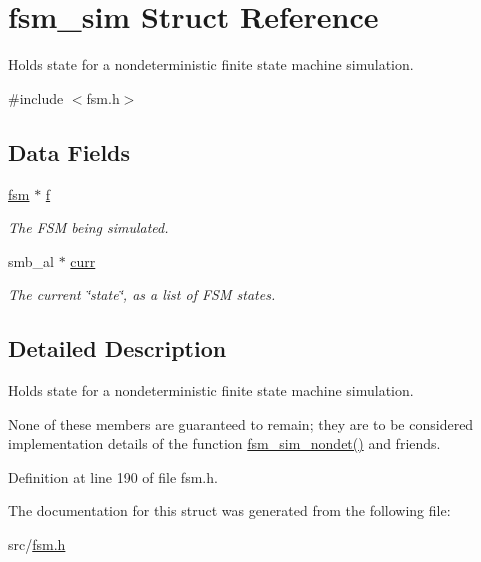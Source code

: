 \hypertarget{structfsm__sim}{\section{fsm\-\_\-sim \-Struct \-Reference}
\label{structfsm__sim}
}


\-Holds state for a nondeterministic finite state machine simulation.  




{\ttfamily \#include $<$fsm.\-h$>$}

\subsection*{\-Data \-Fields}
\begin{DoxyCompactItemize}
\item 
\hypertarget{structfsm__sim_adb419c73376b8d2d2393ffb15910f71b}{\hyperlink{structfsm}{fsm} $\ast$ \hyperlink{structfsm__sim_adb419c73376b8d2d2393ffb15910f71b}{f}}\label{structfsm__sim_adb419c73376b8d2d2393ffb15910f71b}

\begin{DoxyCompactList}\small\item\em \-The \-F\-S\-M being simulated. \end{DoxyCompactList}\item 
\hypertarget{structfsm__sim_a2a263ebdc022dbb02c7d4bb15c344f7c}{smb\-\_\-al $\ast$ \hyperlink{structfsm__sim_a2a263ebdc022dbb02c7d4bb15c344f7c}{curr}}\label{structfsm__sim_a2a263ebdc022dbb02c7d4bb15c344f7c}

\begin{DoxyCompactList}\small\item\em \-The current \char`\"{}state\char`\"{}, as a list of \-F\-S\-M states. \end{DoxyCompactList}\end{DoxyCompactItemize}


\subsection{\-Detailed \-Description}
\-Holds state for a nondeterministic finite state machine simulation. 

\-None of these members are guaranteed to remain; they are to be considered implementation details of the function \hyperlink{simulation_8c_ab39350b6a48388414f90cb3d248be612}{fsm\-\_\-sim\-\_\-nondet()} and friends. 

\-Definition at line 190 of file fsm.\-h.



\-The documentation for this struct was generated from the following file\-:\begin{DoxyCompactItemize}
\item 
src/\hyperlink{fsm_8h}{fsm.\-h}\end{DoxyCompactItemize}
